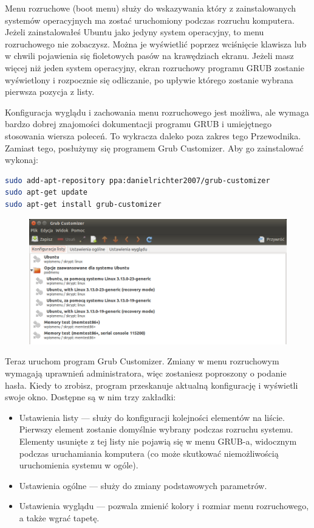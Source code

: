Menu rozruchowe (boot menu) służy do wskazywania który z zainstalowanych systemów operacyjnych ma zostać uruchomiony podczas rozruchu komputera. Jeżeli zainstalowałeś Ubuntu jako jedyny system operacyjny, to menu rozruchowego nie zobaczysz. Można je wyświetlić poprzez wciśnięcie klawisza  lub \keys{\arrowkeydown} w chwili pojawienia się fioletowych pasów na krawędziach ekranu. Jeżeli masz więcej niż jeden system operacyjny, ekran rozruchowy programu GRUB zostanie wyświetlony i rozpocznie się odliczanie, po upływie którego zostanie wybrana pierwsza pozycja z listy.

Konfiguracja wyglądu i zachowania menu rozruchowego jest możliwa, ale wymaga bardzo dobrej znajomości dokumentacji programu GRUB i umiejętnego stosowania wiersza poleceń. To wykracza daleko poza zakres tego Przewodnika. Zamiast tego, posłużymy się programem \textcolor{ubuntu_orange}{Grub Customizer}. Aby go zainstalować wykonaj:
\begin{lstlisting}[language=bash]
sudo add-apt-repository ppa:danielrichter2007/grub-customizer
sudo apt-get update
sudo apt-get install grub-customizer
\end{lstlisting}

\begin{figure}
	\vspace{-10pt}
	\includegraphics[width=\linewidth]{images/programy_grub_customizer.png}
\end{figure}

Teraz uruchom program Grub Customizer. Zmiany w menu rozruchowym wymagają uprawnień administratora, więc zostaniesz poproszony o podanie hasła. Kiedy to zrobisz, program przeskanuje aktualną konfigurację i wyświetli swoje okno. Dostępne są w nim trzy zakładki:
\vspace{0.1cm}
\begin{itemize}
\item \textcolor{ubuntu_orange}{Ustawienia listy} --- służy do konfiguracji kolejności elementów na liście. Pierwszy element zostanie domyślnie wybrany podczas rozruchu systemu. Elementy usunięte z tej listy nie pojawią się w menu GRUB-a, widocznym podczas uruchamiania komputera (co może skutkować niemożliwością uruchomienia systemu w ogóle).
\item \textcolor{ubuntu_orange}{Ustawienia ogólne} --- służy do zmiany podstawowych parametrów.
\item \textcolor{ubuntu_orange}{Ustawienia wyglądu} --- pozwala zmienić kolory i rozmiar menu rozruchowego, a także wgrać tapetę.
\end{itemize}

